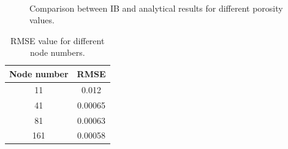 \begin{figure}[H]
	\centering
	\quad
	\\
	\quad
	\caption{Comparison between IB and analytical results for different porosity values.}
	\label{fig:C3_virtualBoundaryResultNodeNumber}
\end{figure}

\begin{table}[H]
\centering
\begin{tabular}{c | c }
	 Node number & RMSE \\ \hline \hline
	 11 & 0.012 \\ \hline
	 41 & 0.00065 \\ \hline
	 81 & 0.00063 \\ \hline
	 161 & 0.00058 \\
\end{tabular}
\caption{RMSE value for different node numbers.}
\label{table:C3_virtualBoundaryResultNodeNumberRMSE}
\end{table}

